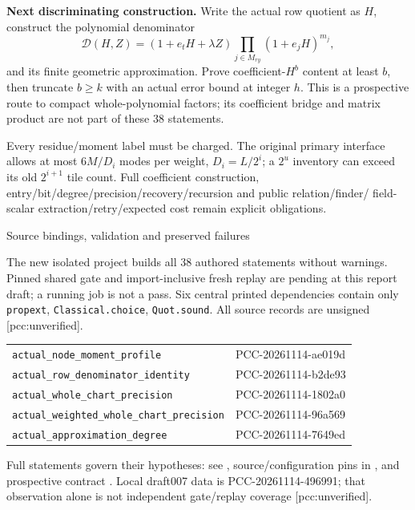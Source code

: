 \documentclass[10pt]{article}
\begin{document}
\textbf{Next discriminating construction.} Write the actual row quotient as
$H$, construct the polynomial denominator
\[
 \mathcal D(H,Z)=(1+e_tH+\lambda Z)
       \prod_{j\in M_{ry}}(1+e_jH)^{m_j},
\]
and its finite geometric approximation. Prove coefficient-$H^b$ content
at least $b$, then truncate $b\ge k$ with an actual error bound at integer
$h$. This is a prospective route to compact whole-polynomial factors; its
coefficient bridge and matrix product are not part of these 38 statements.

Every residue/moment label must be charged. The original primary interface
allows at most $6M/D_i$ modes per weight, $D_i=L/2^i$; a $2^u$ inventory
can exceed its old $2^{i+1}$ tile count. Full coefficient construction,
entry/bit/degree/precision/recovery/recursion and public relation/finder/
field-scalar extraction/retry/expected cost remain explicit obligations.

\newpage
\begin{center}{\Large Source bindings, validation and preserved failures}\end{center}
The new isolated project builds all 38 authored statements without warnings.
Pinned shared gate and import-inclusive fresh replay are pending at this
report draft; a running job is not a pass. Six central printed dependencies
contain only \texttt{propext}, \texttt{Classical.choice}, \texttt{Quot.sound}.
All source records are unsigned [pcc:unverified].

\begin{center}\small
\begin{tabular}{p{.64\linewidth}p{.25\linewidth}}
\texttt{actual\_node\_moment\_profile}&PCC-20261114-ae019d\\
\texttt{actual\_row\_denominator\_identity}&PCC-20261114-b2de93\\
\texttt{actual\_whole\_chart\_precision}&PCC-20261114-1802a0\\
\texttt{actual\_weighted\_whole\_chart\_precision}&PCC-20261114-96a569\\
\texttt{actual\_approximation\_degree}&PCC-20261114-7649ed
\end{tabular}
\end{center}
Full statements govern their hypotheses: see
, source/configuration pins in
, and prospective contract
. Local draft007 data is PCC-20261114-496991;
that observation alone is not independent gate/replay coverage
[pcc:unverified].
\end{document}
